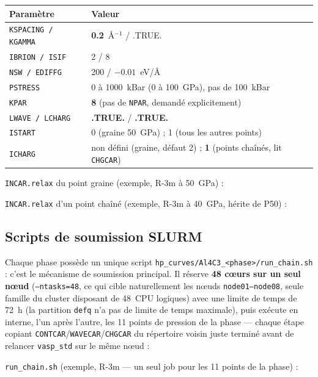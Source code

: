 \documentclass[11pt,a4paper]{article}
\begin{document}
\begin{center}
\begin{tabular}{ll}
\toprule
Paramètre & Valeur \\
\midrule
\texttt{KSPACING / KGAMMA} & \textbf{0.2}~\AA$^{-1}$ / .TRUE. \\
\texttt{IBRION / ISIF} & 2 / 8 \\
\texttt{NSW / EDIFFG} & 200 / $-0.01$~eV/\AA \\
\texttt{PSTRESS} & 0 à 1000~kBar (0 à 100~GPa), pas de 100~kBar \\
\texttt{KPAR} & \textbf{8} (pas de \texttt{NPAR}, demandé explicitement) \\
\texttt{LWAVE / LCHARG} & \textbf{.TRUE.} / \textbf{.TRUE.} \\
\texttt{ISTART} & 0 (graine 50~GPa) ; 1 (tous les autres points) \\
\texttt{ICHARG} & non défini (graine, défaut 2) ; \textbf{1} (points chaînés, lit \texttt{CHGCAR}) \\
\bottomrule
\end{tabular}
\end{center}

\texttt{INCAR.relax} du point graine (exemple, R-3m à 50~GPa) :


\texttt{INCAR.relax} d'un point chaîné (exemple, R-3m à 40~GPa, hérite de P50) :


\subsection{Scripts de soumission SLURM}

Chaque phase possède un unique script \texttt{hp\_curves/Al4C3\_<phase>/run\_chain.sh} : c'est
le mécanisme de soumission principal. Il réserve \textbf{48 cœurs sur un seul nœud}
(\texttt{--ntasks=48}, ce qui cible naturellement les nœuds \texttt{node01--node08}, seule
famille du cluster disposant de 48~CPU logiques) avec une limite de temps de 72~h (la partition
\texttt{defq} n'a pas de limite de temps maximale), puis exécute en interne, l'un après
l'autre, les 11 points de pression de la phase — chaque étape copiant
\texttt{CONTCAR}/\texttt{WAVECAR}/\texttt{CHGCAR} du répertoire voisin juste terminé avant de
relancer \texttt{vasp\_std} sur le même nœud :

\texttt{run\_chain.sh} (exemple, R-3m — un seul job pour les 11 points de la phase) :

\end{document}
